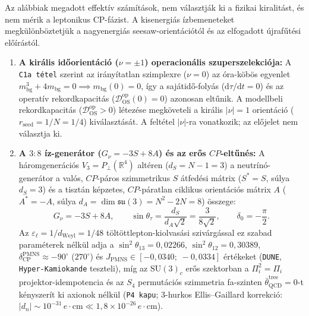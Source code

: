 \documentclass[11pt,a4paper]{article}
\begin{document}
Az alábbiak megadott effektív számítások, nem választják ki a fizikai kiralitást, és nem mérik a leptonikus CP-fázist. A kisenergiás ízbemeneteket megkülönböztetjük a nagyenergiás seesaw-orientációtól és az elfogadott újrafűtési előírástól.
\begin{enumerate}[label=(\arabic*),leftmargin=1.8em,itemsep=2pt]
\item \textbf{A királis időorientáció ($\nu = \pm 1$) operacionális szuperszelekciója:} A \texttt{C1a tétel} szerint az irányítatlan szimplexre ($\nu = 0$) az óra-köbös egyenlet $m_{\mathrm{bg}}^3 + 4m_{\mathrm{bg}} = 0 \implies m_{\mathrm{bg}}(0) = 0$, így a sajátidő-folyás ($\mathrm{d}\tau/\mathrm{d}t = 0$) és az operatív rekordkapacitás ($\mathcal{D}_{\mathrm{OS}}^{\mathrm{op}}(0) = 0$) azonosan eltűnik. A modellbeli rekordkapacitás ($\mathcal{D}_{\mathrm{OS}}^{\mathrm{op}} > 0$) létezése megköveteli a királis $|\nu| = 1$ orientáció ($r_{\mathrm{seed}} = 1/N = 1/4$) kiválasztását. A feltétel $|\nu|$-ra vonatkozik; az előjelet nem választja ki.
\item \textbf{A $3:8$ íz-generátor ($G_\nu = -3S + 8A$) és az erős $CP$-eltűnés:} A háromgenerációs $V_3 = P_\perp(\mathbb{R}^4)$ altéren ($d_S = N - 1 = 3$) a neutrínó-generátor a valós, $CP$-páros szimmetrikus $S$ átfedési mátrix ($S^* = S$, súlya $d_S = 3$) és a tisztán képzetes, $CP$-páratlan ciklikus orientációs mátrix $A$ ($A^* = -A$, súlya $d_A = \dim\mathfrak{su}(3) = N^2 - 2N = 8$) összege:
\begin{equation}
G_\nu = -3S + 8A, \qquad \sin\theta_\tau = \frac{d_S}{d_A\sqrt{2}} = \frac{3}{8\sqrt{2}}, \qquad \delta_0 = -\frac{\pi}{2}.
\end{equation}
Az $\varepsilon_\ell = 1/d_{\mathrm{Weyl}} = 1/48$ töltöttlepton-kiolvasási szivárgással ez szabad paraméterek nélkül adja a $\sin^2\theta_{13} = 0{,}02266$, $\sin^2\theta_{12} = 0{,}30389$, $\delta_{\mathrm{CP}}^{\mathrm{PMNS}} \approx -90^\circ$ ($270^\circ$) és $J_{\mathrm{PMNS}} \in [-0{,}0340;\; -0{,}0334]$ értékeket (\texttt{DUNE}, \texttt{Hyper-Kamiokande} teszteli), míg az $\mathrm{SU}(3)_c$ erős szektorban a $\Pi_i^2 = \Pi_i$ projektor-idempotencia és az $S_4$ permutációs szimmetria fa-szinten $\bar{\theta}_{\mathrm{QCD}}^{\mathrm{tree}} = 0$-t kényszerít ki axionok nélkül (\texttt{P4 kapu}; 3-hurkos Ellis--Gaillard korrekció: $|d_n|\sim 10^{-31}\,e\cdot\mathrm{cm} \ll 1{,}8\times 10^{-26}\,e\cdot\mathrm{cm}$).

\end{enumerate}
\end{document}
